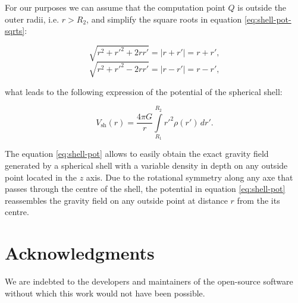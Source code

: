 \documentclass[extra]{gji}
\begin{document}
For our purposes we can assume that the computation point $Q$ is outside the outer radii, i.e. $r>R_2$, and simplify the square roots in equation \ref{eq:shell-pot-sqrts}:

\begin{equation}
    \sqrt{r^2 + r'^2 + 2rr'} = |r + r'| = r + r',
\end{equation}
\begin{equation}
    \sqrt{r^2 + r'^2 - 2rr'} = |r - r'| = r - r',
\end{equation}

\noindent what leads to the following expression of the potential of the spherical shell:

\begin{equation}
    V_\text{sh}(r) = \frac{4\pi G}{r}
    \int\limits_{R_1}^{R_2} {r'}^2 \rho(r') \, dr'.
\label{eq:shell-pot}
\end{equation}

The equation \ref{eq:shell-pot} allows to easily obtain the exact gravity field generated by a spherical shell with a variable density in depth on any outside point located in the $z$ axis.
Due to the rotational symmetry along any axe that passes through the centre of the shell, the potential in equation \ref{eq:shell-pot} reassembles the gravity field on any outside point at distance $r$ from the its centre.

\section{Acknowledgments}

We are indebted to the developers and maintainers of the open-source
software without which this work would not have been possible.




\end{document}

